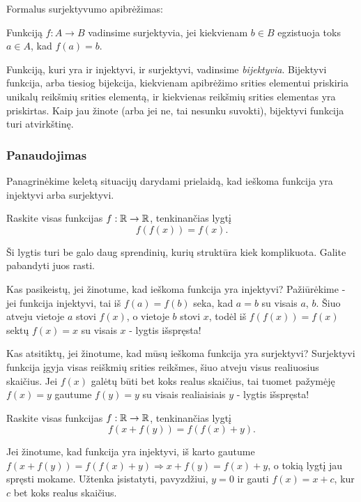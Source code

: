Formalus surjektyvumo apibrėžimas:

\begin{api}
Funkciją $f:A\to B$ vadinsime surjektyvia, jei kiekvienam $b\in B$
egzistuoja toks $a\in A$, kad $f(a)=b$.
\end{api}

Funkciją, kuri yra ir injektyvi, ir surjektyvi, vadinsime
\emph{bijektyvia}.  Bijektyvi funkcija, arba tiesiog bijekcija, kiekvienam
apibrėžimo srities elementui priskiria unikalų reikšmių srities elementą,
ir kiekvienas reikšmių srities elementas yra priskirtas. Kaip jau žinote
(arba jei ne, tai nesunku suvokti), bijektyvi funkcija turi atvirkštinę.

\subsubsection{Panaudojimas}

Panagrinėkime keletą situacijų darydami prielaidą, kad ieškoma funkcija yra
injektyvi arba surjektyvi.

\begin{pav}
Raskite visas funkcijas $f:\mathbb R \to \mathbb R$, tenkinančias lygtį $$f(f(x))=f(x).$$
\end{pav}

Ši lygtis turi be galo daug sprendinių, kurių struktūra kiek komplikuota.
Galite pabandyti juos rasti.

Kas pasikeistų, jei žinotume, kad ieškoma funkcija yra injektyvi?
Pažiūrėkime - jei funkcija injektyvi, tai iš $f(a)=f(b)$ seka, kad $a=b$ su
visais $a$, $b$. Šiuo atveju vietoje $a$ stovi $f(x)$, o vietoje $b$ stovi
$x$, todėl iš $f(f(x))=f(x)$ sektų $f(x)=x$ su visais $x$ - lygtis
išspręsta!

Kas atsitiktų, jei žinotume, kad mūsų ieškoma funkcija yra surjektyvi?
Surjektyvi funkcija įgyja visas reiškmių srities reikšmes, šiuo atveju
visus realiuosius skaičius. Jei $f(x)$ galėtų būti bet koks realus skaičius,
tai tuomet pažymėję $f(x)=y$ gautume $f(y)=y$ su visais realiaisiais $y$ -
lygtis išspręsta!

\begin{pav}
Raskite visas funkcijas $f:\mathbb R \to \mathbb R$, tenkinančias lygtį $$f(x+f(y)) =
f(f(x)+y).$$
\end{pav}

Jei žinotume, kad funkcija yra injektyvi, iš karto gautume $f(x+f(y)) =
f(f(x)+y) \Rightarrow x+f(y) = f(x)+y$, o tokią lygtį jau spręsti mokame.
Užtenka įsistatyti, pavyzdžiui, $y=0$ ir gauti $f(x)=x+c$, kur $c$ bet koks
realus skaičius.

